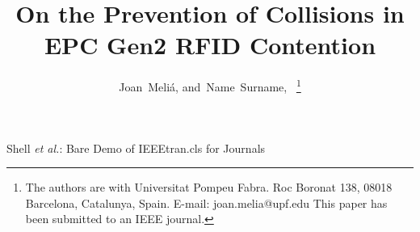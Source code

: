 \documentclass[journal]{IEEEtran}
\begin{document}
%
\title{On the Prevention of Collisions in EPC Gen2 RFID Contention}
%
%
%


\author{Joan~Meli\'{a}, %
        and~Name~Surname,~%
\thanks{The authors are with Universitat Pompeu Fabra.
Roc Boronat 138, 08018 Barcelona, Catalunya, Spain.
E-mail: joan.melia@upf.edu
This paper has been submitted to an IEEE journal.
}
}

%
%



%
{Shell \MakeLowercase{\textit{et al.}}: Bare Demo of IEEEtran.cls for Journals}
%
\end{document}

